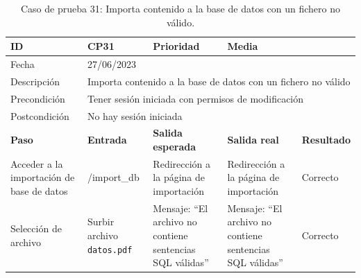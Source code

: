 \begin{table}[H]
\small
\begin{tabular}{p{} p{} p{} p{} p{}}
\cellcolor{gray!25}
ID   & CP31 & \cellcolor{gray!25} Prioridad   & Media \\ \hline
\cellcolor{gray!25} Fecha	&	\multicolumn{4}{l}{27/06/2023} \\ \hline
\cellcolor{gray!25} Descripción		&	\multicolumn{4}{p{.66\textwidth}}{Importa contenido a la base de datos con un fichero no válido} \\ \hline                                            
\cellcolor{gray!25}
Precondición  & \multicolumn{4}{p{.66\textwidth}}{Tener sesión iniciada con permisos de modificación} \\ \hline
\cellcolor{gray!25} Postcondición & \multicolumn{4}{l}{No hay sesión iniciada}                                                    \\ \hline
\rowcolor{gray!25}
\textbf{Paso}   & \textbf{Entrada} & \textbf{Salida esperada} & \textbf{Salida real} & \textbf{Resultado} \\ \hline
Acceder a la importación de base de datos
& /import\_db                                                                          
& Redirección a la página de importación                              
& Redirección a la página de importación                               
& Correcto                            
\\ \hline
Selección de archivo
& Surbir archivo \texttt{datos.pdf}                                                                       
& Mensaje: ``El archivo no contiene sentencias SQL válidas''                             
& Mensaje: ``El archivo no contiene sentencias SQL válidas''                                
& Correcto                            
\\ \hline
\end{tabular}
\caption{Caso de prueba 31: Importa contenido a la base de datos con un fichero no válido.}\label{table:CP31}
\end{table}

